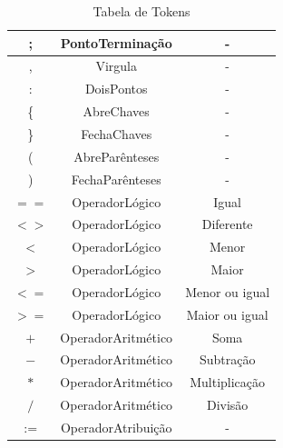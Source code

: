 \documentclass[11pt]{article}
\begin{document}
\begin{table}[H]
\begin{tabular}{c|c|c}
        \hline
         ;                 &        PontoTerminação   &            -                \\
        \hline
         ,                 &        Virgula           &            -                \\
        \hline
         :                 &        DoisPontos        &            -                \\
        \hline
         \{                &        AbreChaves        &            -                \\
        \hline
         \}                &        FechaChaves       &            -                \\
        \hline
         (                 &        AbreParênteses    &            -                \\
        \hline
         )                 &        FechaParênteses   &            -                \\
        \hline
        \hline
         $==$              &      OperadorLógico  &            Igual                     \\
        \hline
         $<>$              &      OperadorLógico  &            Diferente                 \\
        \hline
         $<$               &      OperadorLógico  &            Menor                     \\
        \hline
         $>$               &      OperadorLógico  &            Maior                     \\
        \hline
         $<=$              &      OperadorLógico  &            Menor ou igual            \\
        \hline
         $>=$              &      OperadorLógico  &            Maior  ou igual           \\
        \hline
        \hline
         $+$               &      OperadorAritmético  &            Soma                      \\
        \hline
         $-$               &      OperadorAritmético  &            Subtração                 \\
        \hline
         $*$               &      OperadorAritmético  &            Multiplicação             \\
        \hline
         $/$               &      OperadorAritmético  &            Divisão                   \\
        \hline
        \hline
         $:=$              &      OperadorAtribuição  &            -                         \\
        \hline
       

        
    \end{tabular}
    \caption{Tabela de Tokens}
\end{table}
\end{document}
